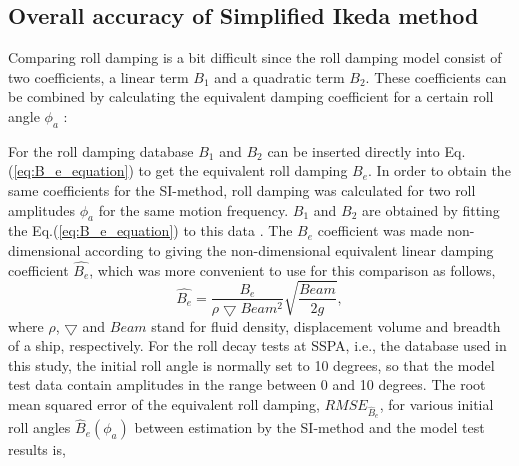 \subsection{Overall accuracy of Simplified Ikeda method}
\label{se:overall_comparison}
Comparing roll damping is a bit difficult since the roll damping model consist of two coefficients, a linear term $B_1$ and a quadratic term $B_2$. These coefficients can be combined by calculating the equivalent damping coefficient for a certain roll angle $\phi_a$ \parencite{himeno_prediction_1981}:



For the roll damping database $B_1$ and $B_2$ can be inserted directly into Eq.(\ref{eq:B_e_equation}) to get the equivalent roll damping $B_e$. In order to obtain the same coefficients for the SI-method, roll damping was calculated for two roll amplitudes $\phi_a$ for the same motion frequency. $B_1$ and $B_2$ are obtained by fitting the Eq.(\ref{eq:B_e_equation}) to this data \parencite{himeno_prediction_1981}. The $B_e$ coefficient was made non-dimensional according to \parencite{himeno_prediction_1981}  giving the non-dimensional equivalent linear damping coefficient $\hat{B_e}$, which was more convenient to use for this comparison as follows,
\begin{equation} \label{eq:be_eqvalent}
    \hat{B_e} = \frac{B_e}{\rho \bigtriangledown Beam^2} \sqrt{\frac{Beam}{2g}},
\end{equation}
where $\rho$, $\bigtriangledown$ and $Beam$ stand for fluid density, displacement volume and breadth of a ship, respectively.
For the roll decay tests at SSPA, i.e., the database used in this study, the initial roll angle is normally set to 10 degrees, so that the model test data contain amplitudes in the range between 0 and 10 degrees. The root mean squared error of the equivalent roll damping, $RMSE_{\hat{B}_e}$, for various initial roll angles $\hat{B}_e(\phi_a)$ between estimation by the SI-method and the model test results is,

